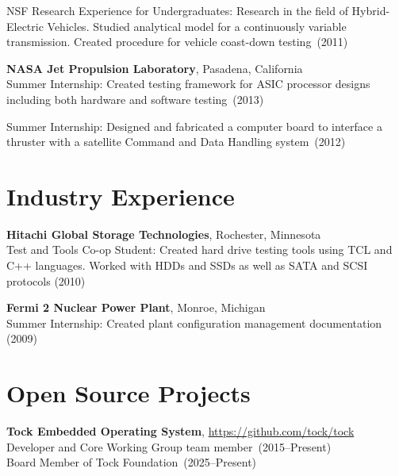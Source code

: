 \documentclass{article}
\begin{document}
NSF Research Experience for Undergraduates: Research in the field of
Hybrid-Electric Vehicles. Studied analytical model for a continuously variable
transmission. Created procedure for vehicle coast-down testing~(2011)


{\bf NASA Jet Propulsion Laboratory}, Pasadena, California \\
Summer Internship: Created testing framework for ASIC processor designs
including both hardware and software testing~(2013)

Summer Internship: Designed and fabricated a computer board to interface a
thruster with a satellite Command and Data Handling system~(2012)



\section*{Industry Experience}
\vspace{-6pt}

{\bf Hitachi Global Storage Technologies}, Rochester, Minnesota \\
Test and Tools Co-op Student: Created hard drive testing tools using TCL and
C++ languages. Worked with HDDs and SSDs as well as SATA and SCSI protocols (2010)

{\bf Fermi 2 Nuclear Power Plant}, Monroe, Michigan \\
Summer Internship: Created plant configuration management documentation (2009)

\section*{Open Source Projects}
\vspace{-6pt}

{\bf Tock Embedded Operating System}, \url{https://github.com/tock/tock} \\
Developer and Core Working Group team member~(2015--Present) \\
Board Member of Tock Foundation~(2025--Present)


\end{document}
